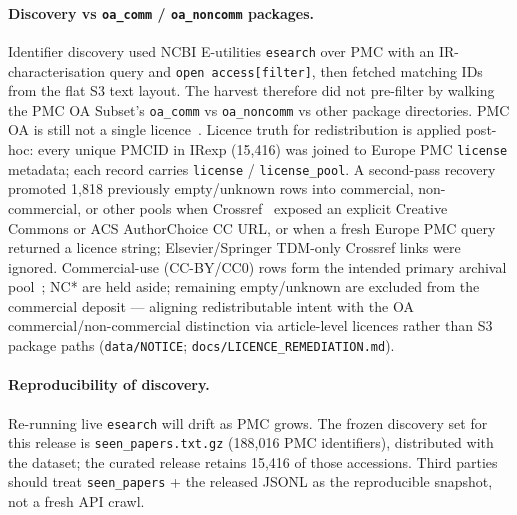 \documentclass[pdflatex,sn-nature]{sn-jnl}
\begin{document}
\paragraph{Discovery vs \texttt{oa\_comm} / \texttt{oa\_noncomm} packages.}
Identifier discovery used NCBI E-utilities \texttt{esearch} over PMC with an
IR-characterisation query and \texttt{open access[filter]}, then fetched matching
IDs from the flat S3 text layout.
The harvest therefore did not pre-filter by walking the PMC OA Subset's
\texttt{oa\_comm} vs \texttt{oa\_noncomm} vs other package directories.
PMC OA is still not a single licence~\citep{pmc_oa}.
Licence truth for redistribution is applied post-hoc: every unique PMCID in IRexp
(15,416) was joined to Europe PMC \texttt{license} metadata; each record carries
\texttt{license} / \texttt{license\_pool}.
A second-pass recovery promoted 1,818 previously empty/unknown rows into
commercial, non-commercial, or other pools when Crossref~\citep{kemp2022crossref}
exposed an explicit Creative Commons or ACS AuthorChoice CC URL, or when a fresh
Europe PMC query returned a licence string; Elsevier/Springer TDM-only Crossref
links were ignored.
Commercial-use (CC-BY/CC0) rows form the intended primary archival
pool~\citep{hrynaszkiewicz2012open}; NC* are held aside; remaining empty/unknown are
excluded from the commercial deposit --- aligning redistributable intent with the
OA commercial/non-commercial distinction via article-level licences rather than
S3 package paths (\texttt{data/NOTICE}; \texttt{docs/LICENCE\_REMEDIATION.md}).

\paragraph{Reproducibility of discovery.}
Re-running live \texttt{esearch} will drift as PMC grows.
The frozen discovery set for this release is
\texttt{seen\_papers.txt.gz} (188,016 PMC identifiers), distributed with the
dataset;
the curated release retains 15,416 of those accessions.
Third parties should treat \texttt{seen\_papers} + the released JSONL as the
reproducible snapshot, not a fresh API crawl.
\end{document}
